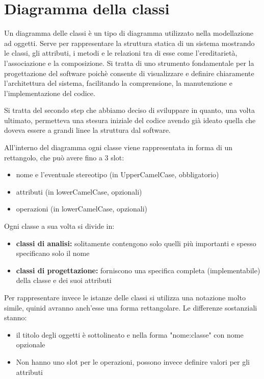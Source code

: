 \documentclass[a4paper, 11pt,oneside,]{book}
\newcommand{\spacing}{\par\bigskip\noindent}
\begin{document}
\chapter{Diagramma della classi}
    Un diagramma delle classi è un tipo di diagramma utilizzato nella modellazione ad oggetti. Serve per rappresentare la struttura statica di un sistema mostrando le classi, gli attributi, i metodi
    e le relazioni tra di esse come l'ereditarietà, l'associazione e la composizione. Si tratta di uno strumento fondamentale per la progettazione del software poichè consente di visualizzare e definire
    chiaramente l'architettura del sistema, facilitando la comprensione, la manutenzione e l'implementazione del codice.
    \spacing
    Si tratta del secondo step che abbiamo deciso di sviluppare in quanto, una volta ultimato, permetteva una stesura iniziale del codice avendo già ideato quella che doveva essere a grandi linee la 
    struttura dal software.
    \spacing
    All'interno del diagramma ogni classe viene rappresentata in forma di un rettangolo, che può avere fino a 3 slot:
    \begin{itemize}
        \item nome e l'eventuale stereotipo (in UpperCamelCase, obbligatorio)
        \item attributi (in lowerCamelCase, opzionali)
        \item operazioni (in lowerCamelCase, opzionali)
    \end{itemize}
    Ogni classe a sua volta si divide in:
    \begin{itemize}
        \item \textbf{classi di analisi:} solitamente contengono solo quelli più importanti e spesso specificano solo il nome
        \item \textbf{classi di progettazione:} forniscono una specifica completa (implementabile) della classe e dei suoi attributi
    \end{itemize}
    Per rappresentare invece le istanze delle classi si utilizza una notazione molto simile, quinid avranno anch'esse una forma rettangolare. Le differenze sostanziali stanno:
    \begin{itemize}
        \item il titolo degli oggetti è sottolineato e nella forma "nome:classe" con nome opzionale
        \item Non hanno uno slot per le operazioni, possono invece definire valori per gli attributi
    \end{itemize}
\end{document}
